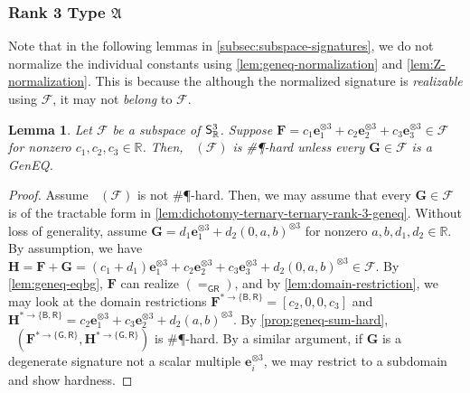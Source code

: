 \documentclass[11pt]{article}
\newtheorem{lemma}[theorem]{Lemma}
\DeclareMathOperator{\holbs}{Holant^*_2}
\DeclareMathOperator{\holts}{Holant^*_3}
\newcommand{\db}{\mathsf{B}}
\newcommand{\dg}{\mathsf{G}}
\newcommand{\dr}{\mathsf{R}}
\newcommand{\geneq}{\textsf{GenEQ}\xspace}
\newcommand{\sph}{\#\P-hard\xspace}
\newcommand{\teh}{^{\otimes 3}}
\newcommand{\domres}[1]{
  ^{*\to\{#1\}}
}
\newcommand{\ternarytractgeneq}{$\mathfrak{A}$\xspace}
\begin{document}
\subsubsection{Rank 3 Type \texorpdfstring{\ternarytractgeneq}{A}}
Note that in the following lemmas in \cref{subsec:subspace-signatures}, we do not normalize the individual constants using \cref{lem:geneq-normalization} and \cref{lem:Z-normalization}. This is because the although the normalized signature is \textit{realizable} using $\mathscr{F}$, it may not \textit{belong} to $\mathscr{F}$.
\begin{lemma}\label{lem:dichotomy-subspace-rank-3-geneq}
  Let $\mathscr{F}$ be a subspace of $\mathsf{S}^3_{\mathbb{R}}$.
  Suppose $\mathbf{F} = c_1 \mathbf{e}_1\teh + c_2 \mathbf{e}_2\teh + c_3 \mathbf{e}_3 \teh \in \mathscr{F}$ for nonzero $c_1, c_2, c_3 \in \mathbb{R}$.
  Then, $\holts(\mathscr{F})$ is \sph unless every $\mathbf{G} \in \mathscr{F}$ is a \geneq.
\end{lemma}
\begin{proof}
Assume $\holts(\mathscr{F})$ is not \sph.
  Then, we may assume that every $\mathbf{G} \in \mathscr{F}$ is of the tractable form in \cref{lem:dichotomy-ternary-ternary-rank-3-geneq}.
  Without loss of generality, assume $\mathbf{G} = d_1 \mathbf{e}_1 \teh + d_2 (0, a, b)\teh$ for nonzero $a, b, d_1, d_2 \in \mathbb{R}$.
  By assumption, we have $\mathbf{H} = \mathbf{F} + \mathbf{G} = (c_1 + d_1)\mathbf{e}_1\teh + c_2 \mathbf{e}_2\teh + c_3 \mathbf{e}_3 \teh + d_2(0, a, b)\teh \in \mathscr{F}$.
  By \cref{lem:geneq-eqbg}, $\mathbf{F}$ can realize $(=_{\dg \dr})$, and by \cref{lem:domain-restriction}, we may look at the domain restrictions $\mathbf{F}\domres{\db, \dr} = [c_2, 0, 0, c_3]$ and $\mathbf{H}\domres{\db, \dr} = c_2 \mathbf{e}_1\teh + c_3 \mathbf{e}_2 \teh + d_2(a, b)\teh$.
By \cref{prop:geneq-sum-hard}, $\holbs(\mathbf{F}\domres{\dg, \dr}, \mathbf{H}\domres{\dg, \dr})$ is \sph.
  By a similar argument, if $\mathbf{G}$ is a degenerate signature not a scalar multiple $\mathbf{e}_i \teh$, we may restrict to a subdomain and show hardness. 
\end{proof}
\end{document}
